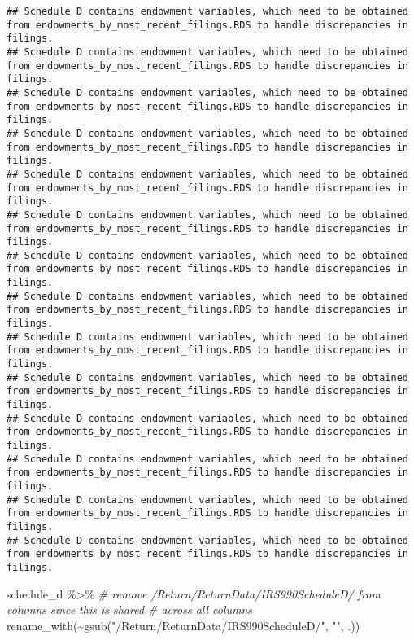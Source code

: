 \documentclass[
]{article}
\newenvironment{Shaded}{\begin{snugshade}}{\end{snugshade}}
\newcommand{\CommentTok}[1]{\textcolor[rgb]{0.56,0.35,0.01}{\textit{#1}}}
\newcommand{\FunctionTok}[1]{\textcolor[rgb]{0.00,0.00,0.00}{#1}}
\newcommand{\NormalTok}[1]{#1}
\newcommand{\SpecialCharTok}[1]{\textcolor[rgb]{0.00,0.00,0.00}{#1}}
\newcommand{\StringTok}[1]{\textcolor[rgb]{0.31,0.60,0.02}{#1}}
\begin{document}
\begin{verbatim}
## Schedule D contains endowment variables, which need to be obtained from endowments_by_most_recent_filings.RDS to handle discrepancies in filings.
## Schedule D contains endowment variables, which need to be obtained from endowments_by_most_recent_filings.RDS to handle discrepancies in filings.
## Schedule D contains endowment variables, which need to be obtained from endowments_by_most_recent_filings.RDS to handle discrepancies in filings.
## Schedule D contains endowment variables, which need to be obtained from endowments_by_most_recent_filings.RDS to handle discrepancies in filings.
## Schedule D contains endowment variables, which need to be obtained from endowments_by_most_recent_filings.RDS to handle discrepancies in filings.
## Schedule D contains endowment variables, which need to be obtained from endowments_by_most_recent_filings.RDS to handle discrepancies in filings.
## Schedule D contains endowment variables, which need to be obtained from endowments_by_most_recent_filings.RDS to handle discrepancies in filings.
## Schedule D contains endowment variables, which need to be obtained from endowments_by_most_recent_filings.RDS to handle discrepancies in filings.
## Schedule D contains endowment variables, which need to be obtained from endowments_by_most_recent_filings.RDS to handle discrepancies in filings.
## Schedule D contains endowment variables, which need to be obtained from endowments_by_most_recent_filings.RDS to handle discrepancies in filings.
## Schedule D contains endowment variables, which need to be obtained from endowments_by_most_recent_filings.RDS to handle discrepancies in filings.
## Schedule D contains endowment variables, which need to be obtained from endowments_by_most_recent_filings.RDS to handle discrepancies in filings.
## Schedule D contains endowment variables, which need to be obtained from endowments_by_most_recent_filings.RDS to handle discrepancies in filings.
## Schedule D contains endowment variables, which need to be obtained from endowments_by_most_recent_filings.RDS to handle discrepancies in filings.
\end{verbatim}

\begin{Shaded}
\begin{Highlighting}[]
\NormalTok{schedule\_d }\SpecialCharTok{\%\textgreater{}\%}
  \CommentTok{\# remove /Return/ReturnData/IRS990ScheduleD/ from columns since this is shared}
  \CommentTok{\# across all columns}
  \FunctionTok{rename\_with}\NormalTok{(}\SpecialCharTok{\textasciitilde{}}\FunctionTok{gsub}\NormalTok{(}\StringTok{"/Return/ReturnData/IRS990ScheduleD/"}\NormalTok{, }\StringTok{""}\NormalTok{, .))}
\end{Highlighting}
\end{Shaded}
\end{document}
